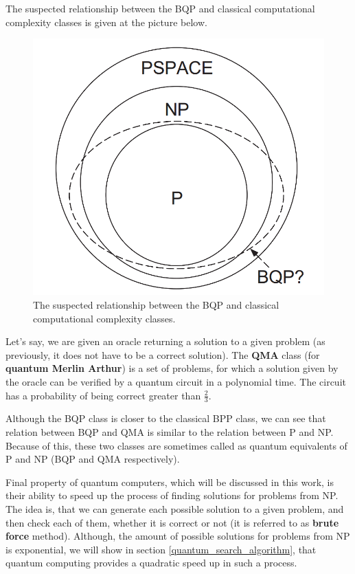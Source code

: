 The suspected relationship between the BQP and classical computational complexity classes is given at the picture below.

\begin{figure}[ht]
\centering
\includegraphics[scale=0.4]{classical_and_quantum_classes_relations}
\caption{The suspected relationship between the BQP and classical computational complexity classes.}
\end{figure}

\begin{definition}
Let's say, we are given an oracle returning a solution to a given problem (as previously, it does not have to be a correct solution). The \textbf{QMA} class (for \textbf{quantum Merlin Arthur}) is a set of problems, for which a solution given by the oracle can be verified by a quantum circuit in a polynomial time. The circuit has a probability of being correct greater than $\frac{2}{3}$.
\end{definition}

\begin{remark}
Although the BQP class is closer to the classical BPP class, we can see that relation between BQP and QMA is similar to the relation between P and NP. Because of this, these two classes are sometimes called as quantum equivalents of P and NP (BQP and QMA respectively).
\end{remark}


Final property of quantum computers, which will be discussed in this work, is their ability to speed up the process of finding solutions for problems from NP. The idea is, that we can generate each possible solution to a given problem, and then check each of them, whether it is correct or not (it is referred to as \textbf{brute force} method). Although, the amount of possible solutions for problems from NP is exponential, we will show in section \ref{quantum_search_algorithm}, that quantum computing provides a quadratic speed up in such a process.


